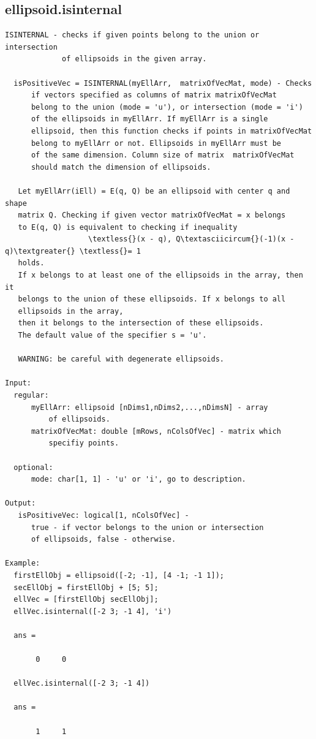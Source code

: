 \documentclass[letterpaper,10pt,english]{sphinxmanual}
\begin{document}
\subsection{ellipsoid.isinternal}
\label{chap_functions:ellipsoid-isinternal}
\begin{Verbatim}[commandchars=\\\{\}]
ISINTERNAL - checks if given points belong to the union or intersection
             of ellipsoids in the given array.

  isPositiveVec = ISINTERNAL(myEllArr,  matrixOfVecMat, mode) - Checks
      if vectors specified as columns of matrix matrixOfVecMat
      belong to the union (mode = 'u'), or intersection (mode = 'i')
      of the ellipsoids in myEllArr. If myEllArr is a single
      ellipsoid, then this function checks if points in matrixOfVecMat
      belong to myEllArr or not. Ellipsoids in myEllArr must be
      of the same dimension. Column size of matrix  matrixOfVecMat
      should match the dimension of ellipsoids.

   Let myEllArr(iEll) = E(q, Q) be an ellipsoid with center q and shape
   matrix Q. Checking if given vector matrixOfVecMat = x belongs
   to E(q, Q) is equivalent to checking if inequality
                   \textless{}(x - q), Q\textasciicircum{}(-1)(x - q)\textgreater{} \textless{}= 1
   holds.
   If x belongs to at least one of the ellipsoids in the array, then it
   belongs to the union of these ellipsoids. If x belongs to all
   ellipsoids in the array,
   then it belongs to the intersection of these ellipsoids.
   The default value of the specifier s = 'u'.

   WARNING: be careful with degenerate ellipsoids.

Input:
  regular:
      myEllArr: ellipsoid [nDims1,nDims2,...,nDimsN] - array
          of ellipsoids.
      matrixOfVecMat: double [mRows, nColsOfVec] - matrix which
          specifiy points.

  optional:
      mode: char[1, 1] - 'u' or 'i', go to description.

Output:
   isPositiveVec: logical[1, nColsOfVec] -
      true - if vector belongs to the union or intersection
      of ellipsoids, false - otherwise.

Example:
  firstEllObj = ellipsoid([-2; -1], [4 -1; -1 1]);
  secEllObj = firstEllObj + [5; 5];
  ellVec = [firstEllObj secEllObj];
  ellVec.isinternal([-2 3; -1 4], 'i')

  ans =

       0     0

  ellVec.isinternal([-2 3; -1 4])

  ans =

       1     1
\end{Verbatim}
\end{document}
